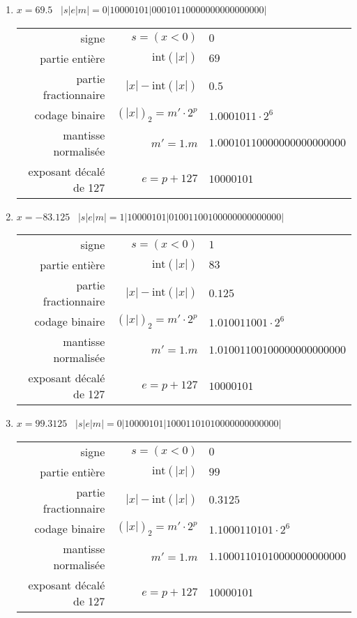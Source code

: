 \documentclass[11pt,a4paper]{article}
\begin{document}
\begin{enumerate}
\item $x = 69.5$ \dotfill\ {$|s|e|m| = 0|10000101|00010110000000000000000|$}
{\footnotesize
\begin{tabular}{r@{ : }r@{ $=$ }l}
signe 					& $s = (x < 0)$ 			& $0$ \\
partie entière 			& $\mbox{int}(|x|)$ 		& $69$ \\
partie fractionnaire 	& $|x| - \mbox{int}(|x|)$ 	& $0.5$ \\
codage binaire 			& $(|x|)_2 = m'\cdot 2^p$   & $1.0001011 \cdot 2^{6}$ \\
mantisse normalisée 	& $m' = 1.m$ 				& $1.00010110000000000000000$ \\
exposant décalé de 127 	& $e = p+127$ 				& $10000101$ \\[2mm]
\end{tabular}
}

\item $x = -83.125$ \dotfill\ {$|s|e|m| = 1|10000101|01001100100000000000000|$}
{\footnotesize
\begin{tabular}{r@{ : }r@{ $=$ }l}
signe 					& $s = (x < 0)$ 			& $1$ \\
partie entière 			& $\mbox{int}(|x|)$ 		& $83$ \\
partie fractionnaire 	& $|x| - \mbox{int}(|x|)$ 	& $0.125$ \\
codage binaire 			& $(|x|)_2 = m'\cdot 2^p$   & $1.010011001 \cdot 2^{6}$ \\
mantisse normalisée 	& $m' = 1.m$ 				& $1.01001100100000000000000$ \\
exposant décalé de 127 	& $e = p+127$ 				& $10000101$ \\[2mm]
\end{tabular}
}

\newpage
\item $x = 99.3125$ \dotfill\ {$|s|e|m| = 0|10000101|10001101010000000000000|$}
{\footnotesize
\begin{tabular}{r@{ : }r@{ $=$ }l}
signe 					& $s = (x < 0)$ 			& $0$ \\
partie entière 			& $\mbox{int}(|x|)$ 		& $99$ \\
partie fractionnaire 	& $|x| - \mbox{int}(|x|)$ 	& $0.3125$ \\
codage binaire 			& $(|x|)_2 = m'\cdot 2^p$   & $1.1000110101 \cdot 2^{6}$ \\
mantisse normalisée 	& $m' = 1.m$ 				& $1.10001101010000000000000$ \\
exposant décalé de 127 	& $e = p+127$ 				& $10000101$ \\[2mm]
\end{tabular}
}


\end{enumerate}
\end{document}
